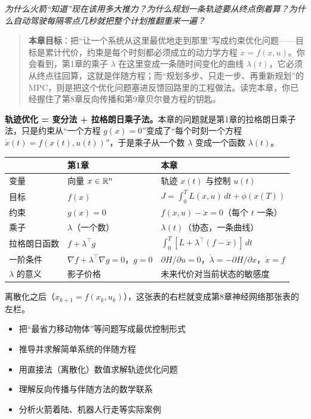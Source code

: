 \vspace{0.3cm}
\noindent\textit{为什么火箭“知道”现在该用多大推力？为什么规划一条轨迹要从终点倒着算？为什么自动驾驶每隔零点几秒就把整个计划推翻重来一遍？}

\begin{quote}
\textbf{本章目标}：把“让一个系统从这里最优地走到那里”写成约束优化问题——目标是累计代价，约束是每个时刻都必须成立的动力学方程 $\dot{x} = f(x, u)$。你会看到，第1章的乘子 $\lambda$ 在这里变成一条随时间变化的曲线 $\lambda(t)$，它必须从终点往回算，这就是伴随方程；而“规划多步、只走一步、再重新规划”的 MPC，则是把这个优化问题塞进反馈回路里的工程做法。读完本章，你已经握住了第8章反向传播和第9章贝尔曼方程的钥匙。
\end{quote}

\begin{tcolorbox}[colback=yellow!10, colframe=orange!80, title=本章的核心观点]
\textbf{轨迹优化 = 变分法 + 拉格朗日乘子法。}本章的问题就是第1章的拉格朗日乘子法，只是约束从“一个方程 $g(x) = 0$”变成了“每个时刻一个方程 $\dot{x}(t) = f(x(t), u(t))$”，于是乘子从一个数 $\lambda$ 变成一个函数 $\lambda(t)$。

\begin{center}
\renewcommand{\arraystretch}{1.3}
\small
\begin{tabularx}{\linewidth}{lXX}
\toprule
 & \textbf{第1章} & \textbf{本章} \\
\midrule
变量 & 向量 $x \in \mathbb{R}^n$ & 轨迹 $x(t)$ 与控制 $u(t)$ \\
目标 & $f(x)$ & $J = \int_0^T L(x, u)\,dt + \phi(x(T))$ \\
约束 & $g(x) = 0$ & $f(x, u) - \dot{x} = 0$（每个 $t$ 一条） \\
乘子 & $\lambda$（一个数） & $\lambda(t)$（协态，一条曲线） \\
拉格朗日函数 & $f + \lambda^\top g$ & $\int_0^T [L + \lambda^\top (f - \dot{x})]\,dt$ \\
一阶条件 & $\nabla f + \lambda^\top \nabla g = 0$，$g = 0$ & $\partial H/\partial u = 0$，$\dot{\lambda} = -\partial H/\partial x$，$\dot{x} = f$ \\
$\lambda$ 的意义 & 影子价格 & 未来代价对当前状态的敏感度 \\
\bottomrule
\end{tabularx}
\end{center}
离散化之后（$x_{k+1} = f(x_k, u_k)$），这张表的右栏就变成第8章神经网络那张表的左栏。
\end{tcolorbox}

\begin{tcolorbox}[colback=green!5, colframe=green!60!black, title=学完这章，你将能够...]
\begin{itemize}
    \item 把“最省力移动物体”等问题写成最优控制形式
    \item 推导并求解简单系统的伴随方程
    \item 用直接法（离散化）数值求解轨迹优化问题
    \item 理解反向传播与伴随方法的数学联系
    \item 分析火箭着陆、机器人行走等实际案例
\end{itemize}
\end{tcolorbox}


